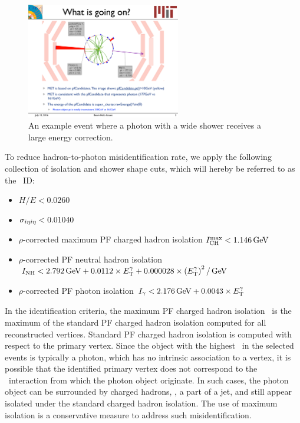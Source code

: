 \begin{figure}[htbp]
  \begin{center}
    \includegraphics[width=0.6\textwidth]{Reconstruction/Figures/badcorr_evtdisp.pdf}
    \caption{
      An example event where a photon with a wide shower receives a large energy correction.
    }
    \label{fig:badcorr_evtdisp}
  \end{center}
\end{figure}

To reduce hadron-to-photon misidentification rate, we apply the following collection of isolation and shower shape cuts, which will hereby be referred to as the \egamma\ ID:
\begin{itemize}
  \item $H/E < 0.0260$
  \item $\sigma_{i\eta i\eta} < 0.01040$
  \item $\rho$-corrected maximum PF charged hadron isolation $I_{\text{CH}}^{\text{max}} < 1.146\,\text{Ge\hspace{-.08em}V}$
  \item $\rho$-corrected PF neutral hadron isolation $I_{\text{NH}} < 2.792\,\text{Ge\hspace{-.08em}V} + 0.0112 \times E_{\mathrm{T}}^{\gamma} + 0.000028 \times \left(E_{\mathrm{T}}^{\gamma} \right)^2/\,\text{Ge\hspace{-.08em}V}$
  \item $\rho$-corrected PF photon isolation $I_{\gamma} < 2.176\,\text{Ge\hspace{-.08em}V} + 0.0043 \times E_{\mathrm{T}}^{\gamma}$
\end{itemize}

In the identification criteria, the maximum PF charged hadron isolation \ICHmax\ is the maximum of the standard PF charged hadron isolation computed for all reconstructed vertices. 
Standard PF charged hadron isolation is computed with respect to the primary vertex. 
Since the object with the highest \pt\ in the selected events is typically a photon, which has no intrinsic association to a vertex, it is possible that the identified primary vertex does not correspond to the \Pp\Pp\ interaction from which the photon object originate. 
In such cases, the photon object can be surrounded by charged hadrons, \ie, a part of a jet, and still appear isolated under the standard charged hadron isolation. 
The use of maximum isolation is a conservative measure to address such misidentification.

